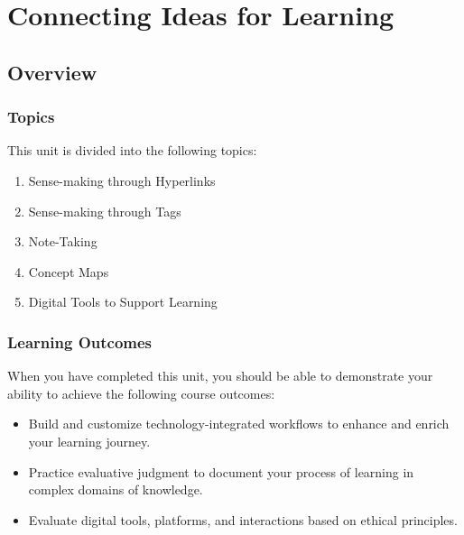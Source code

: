 \documentclass[
]{book}
\providecommand{\tightlist}{%
  \setlength{\itemsep}{0pt}\setlength{\parskip}{0pt}}
\theoremstyle{definition}
\theoremstyle{definition}
\theoremstyle{definition}
\theoremstyle{definition}
\theoremstyle{remark}
\begin{document}
\hypertarget{connecting-ideas-for-learning}{%
\chapter{Connecting Ideas for Learning}\label{connecting-ideas-for-learning}}

\hypertarget{overview-2}{%
\section*{Overview}\label{overview-2}}

\hypertarget{topics-2}{%
\subsection*{Topics}\label{topics-2}}

This unit is divided into the following topics:

\begin{enumerate}
\def\labelenumi{\arabic{enumi}.}
\tightlist
\item
  Sense-making through Hyperlinks
\item
  Sense-making through Tags
\item
  Note-Taking
\item
  Concept Maps
\item
  Digital Tools to Support Learning
\end{enumerate}

\hypertarget{learning-outcomes-2}{%
\subsection*{Learning Outcomes}\label{learning-outcomes-2}}

When you have completed this unit, you should be able to demonstrate your ability to achieve the following course outcomes:

\begin{itemize}
\tightlist
\item
  Build and customize technology-integrated workflows to enhance and enrich your learning journey.\\
\item
  Practice evaluative judgment to document your process of learning in complex domains of knowledge.\\
\item
  Evaluate digital tools, platforms, and interactions based on ethical principles.
\end{itemize}
\end{document}
